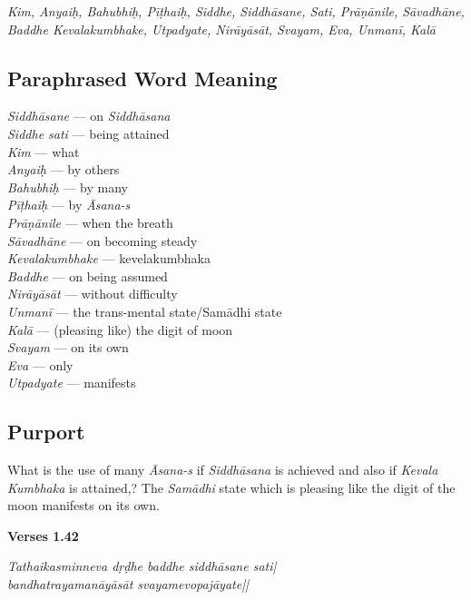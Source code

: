 \textit{Kim, Anyaiḥ, Bahubhiḥ, Pīṭhaiḥ, Siddhe, Siddhāsane, Sati, Prāṇānile, Sāvadhāne, Baddhe Kevalakumbhake, Utpadyate, Nirāyāsāt, Svayam, Eva, Unmanī,  Kalā}

\subsection*{Paraphrased Word Meaning}

\begin{multicols}{2}
\itemsep=0pt
\textit{Siddhāsane} ---  on \textit{Siddhāsana}  \\
\textit{Siddhe sati} --- being attained   \\
\textit{Kim} --- what   \\
\textit{Anyaiḥ} --- by others   \\
\textit{Bahubhiḥ} --- by many  \\
\textit{Pīṭhaiḥ} ---  by \textit{Āsana-s} \\
\textit{Prāṇānile} ---	when the breath\\
\textit{Sāvadhāne} ---  on becoming steady	 \\
\textit{Kevalakumbhake} --- kevelakumbhaka  \\
\textit{Baddhe} ---  on being assumed \\
\textit{Nirāyāsāt} --- without difficulty  \\
\textit{Unmanī} ---  the trans-mental state/Samādhi state \\
\textit{Kalā} --- (pleasing like) the digit of moon  \\
\textit{Svayam} --- on its own \\
\textit{Eva} --- only  \\
\textit{Utpadyate} --- manifests
\end{multicols}

\subsection*{Purport}

What is the use of many \textit{Āsana-s} if \textit{Siddhāsana} is achieved and also if \textit{Kevala} \textit{Kumbhaka} is attained,? The \textit{Samādhi} state which is pleasing like the digit of the moon manifests on its own. 

\noindent \textbf{Verses 1.42}

\begin{shloka}
\textit{Tathaikasminneva dṛḍhe baddhe siddhāsane sati|\\
bandhatrayamanāyāsāt svayamevopajāyate||}
\end{shloka}

